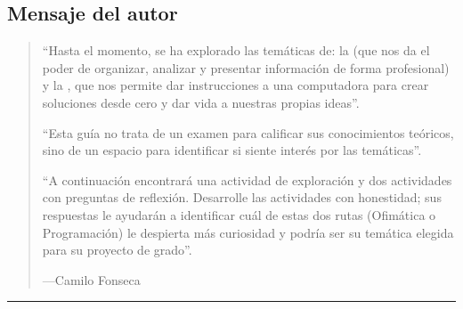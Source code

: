 \documentclass[letterpaper,10pt,spanish]{sphinxmanual}
\begin{document}
\subsection{Mensaje del autor}
\label{\detokenize{1_guias/10informatica/G1002:mensaje-del-autor}}\begin{quote}

\sphinxAtStartPar
“Hasta el momento, se ha explorado las temáticas de: la  (que nos da el poder de organizar, analizar y presentar información de forma profesional) y la , que nos permite dar instrucciones a una computadora para crear soluciones desde cero y dar vida a nuestras propias ideas”.

\sphinxAtStartPar
“Esta guía no trata de un examen para calificar sus conocimientos teóricos, sino de un espacio para identificar si siente interés por las temáticas”.

\sphinxAtStartPar
“A continuación encontrará una actividad de exploración y dos actividades con preguntas de reflexión. Desarrolle las actividades con honestidad; sus respuestas le ayudarán a identificar cuál de estas dos rutas (Ofimática o Programación) le despierta más curiosidad y podría ser su temática elegida para su proyecto de grado”.

\begin{flushright}
---Camilo Fonseca
\end{flushright}
\end{quote}


\bigskip\hrule\bigskip
\end{document}
